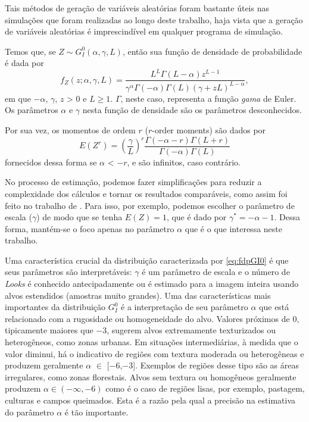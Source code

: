 Tais métodos de geração de variáveis aleatórias foram bastante úteis nas simulações que foram realizadas ao longo deste trabalho, haja vista que a geração de variáveis aleatórias é imprescindível em qualquer programa de simulação. 

Temos que, se $Z \sim G_I^0(\alpha, \gamma, L)$, então sua função de densidade de probabilidade é dada por
\begin{equation}
    f_Z(z; \alpha, \gamma, \textit{L})= \frac{L^L\Gamma(L-\alpha)z^{L-1}}{\gamma^\alpha\Gamma(-\alpha)\Gamma(L)(\gamma + zL)^{L-\alpha}}, \label{eq:fdpGI0}
\end{equation}
em que $-\alpha$, $\gamma$, $z$ > $0$ e $L \geq 1$. 
$\Gamma$, neste caso, representa a função \textit{gama} de Euler. 
Os parâmetros $\alpha$ e $\gamma$ nesta função de densidade são os parâmetros desconhecidos.

Por sua vez, os momentos de ordem $r$ ($r$-order moments) são dados por
\begin{equation}
    E(Z^r) = \left (\frac{\gamma}{L}\right )^{r}\frac{\Gamma(-\alpha-r)\Gamma(L+r)}{\Gamma(-\alpha)\Gamma(L)} \label{eq:moments}
\end{equation}
fornecidos dessa forma se $\alpha$ < $-r$, e são infinitos, caso contrário.

No processo de estimação, podemos fazer simplificações para reduzir a complexidade dos cálculos e tornar os resultados comparáveis, como assim foi feito no trabalho de \citet{FreryStochasticDistances2015}. Para isso, por exemplo, podemos escolher o parâmetro de escala ($\gamma$) de modo que se tenha $E(Z) = 1$, que é dado por $\gamma^{*} = -\alpha - 1$. Dessa forma, mantém-se o foco apenas no parâmetro $\alpha$ que é o que interessa neste trabalho.

Uma característica crucial da distribuição caracterizada por \eqref{eq:fdpGI0} é que seus parâmetros são interpretáveis: $\gamma$ é um parâmetro de escala e o número de \textit{Looks} é conhecido antecipadamente ou é estimado para a imagem inteira usando alvos estendidos (amostras muito grandes). Uma das características mais importantes da distribuição $G_I^0$ é a interpretação de seu parâmetro $\alpha$ que está relacionado com a rugosidade ou homogeneidade do alvo. Valores próximos de $0$, tipicamente maiores que $-3$, sugerem alvos extremamente texturizados ou heterogêneos, como zonas urbanas. Em situações intermediárias, à medida que o valor diminui, há o indicativo de regiões com textura moderada ou heterogêneas e produzem geralmente $\alpha$ $\in$ [$-6$,$-3$]. Exemplos de regiões desse tipo são as áreas irregulares, como zonas florestais. Alvos sem textura ou homogêneos geralmente produzem $\alpha \in (-\infty, -6)$ como é o caso de regiões lisas, por exemplo, pastagem, culturas e campos queimados. Esta é a razão pela qual a precisão na estimativa do parâmetro $\alpha$ é tão importante.

